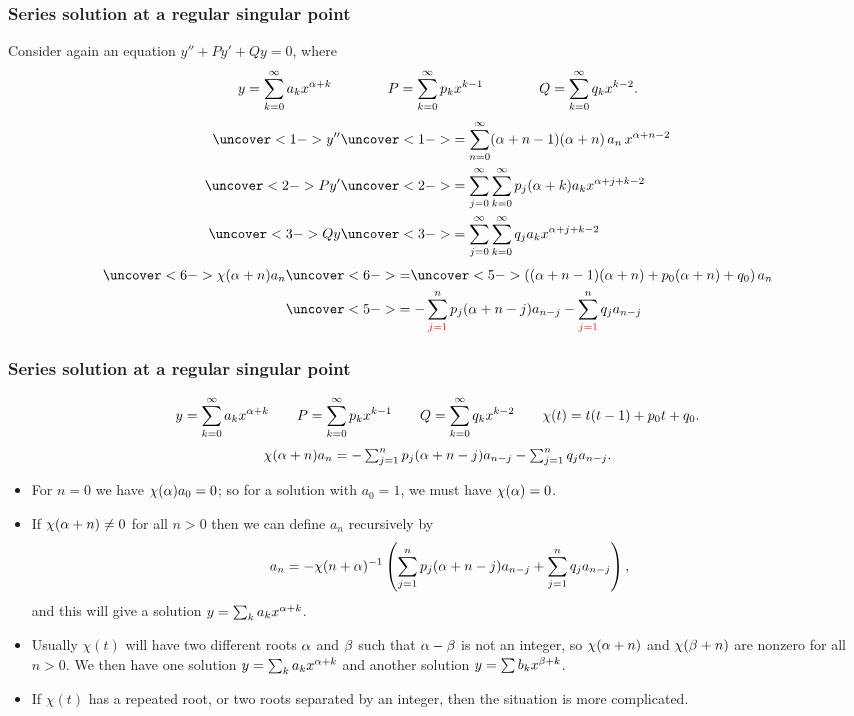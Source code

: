 \documentclass[9pt]{beamer}
\begin{document}
\begin{frame}[t]
 \frametitle{Series solution at a regular singular point}
 
 Consider again an equation $y''+Py'+Qy=0$, where 
 \[ y = \sum_{k=0}^\infty a_kx^{\alpha+k} \hspace{4em}
    P = \sum_{k=0}^\infty p_kx^{k-1} \hspace{4em}
    Q = \sum_{k=0}^\infty q_kx^{k-2}.
 \]
 \begin{align*}
  \uc<1->{y''} &\uc<1->{= \sum_{n=0}^\infty (\al+n-1)(\al+n)\,a_n\,x^{\al+n-2}} \\
  \uc<2->{Py'} &\uc<2->{= \sum_{j=0}^\infty\sum_{k=0}^\infty p_j(\al+k)a_k x^{\al+j+k-2}} \\
  \uc<3->{Qy} &\uc<3->{= \sum_{j=0}^\infty\sum_{k=0}^\infty q_ja_kx^{\al+j+k-2}}
 \end{align*}
 \begin{align*}
  \uc<6->{\chi(\al+n) a_n} &\uc<6->{=} 
    \uc<5->{\left((\al+n-1)(\al+n)+p_0(\al+n)+q_0\right)a_n} \\
   &\uc<5->{= -\sum_{\RED{j=1}}^n p_j(\al+n-j)a_{n-j} - 
      \sum_{\RED{j=1}}^n q_ja_{n-j}}
 \end{align*}
\end{frame}

\begin{frame}[t]
 \frametitle{Series solution at a regular singular point}
 \[ y = \sum_{k=0}^\infty a_kx^{\alpha+k} \qquad
    P = \sum_{k=0}^\infty p_kx^{k-1} \qquad
    Q = \sum_{k=0}^\infty q_kx^{k-2} \qquad \chi(t)=t(t-1)+p_0t+q_0.
 \]
 \[ \textstyle \chi(\alpha+n) a_n = 
     -\sum_{j=1}^n p_j(\alpha+n-j)a_{n-j} -
      \sum_{j=1}^n q_ja_{n-j}.
 \] 

 \reminderbar

 \begin{itemize}
  \item<2-> For $n=0$ we have $\chi(\alpha)a_0=0$; so for a solution with
   $a_0=1$, we must have $\chi(\alpha)=0$.
  \item<3-> If $\chi(\alpha+n)\neq 0$ for all $n>0$ then we can define $a_n$
   recursively by 
   \[ a_n = -\chi(n+\alpha)^{-1}\left( 
       \sum_{j=1}^n p_j(\alpha+n-j)a_{n-j} + 
        \sum_{j=1}^n q_ja_{n-j}\right),
   \] 
   and this will give a solution $y=\sum_ka_kx^{\alpha+k}$.
  \item<4-> Usually $\chi(t)$ will have two different roots $\alpha$ and
   $\beta$ such that $\alpha-\beta$ is not an integer, so $\chi(\alpha+n)$ and
   $\chi(\beta+n)$ are nonzero for all $n>0$.  We then have one solution
   $y=\sum_ka_kx^{\alpha+k}$ and another solution $y=\sum b_kx^{\beta+k}$.
  \item<5-> If $\chi(t)$ has a repeated root, or two roots separated by an
   integer, then the situation is more complicated.
 \end{itemize}
\end{frame}
\end{document}
